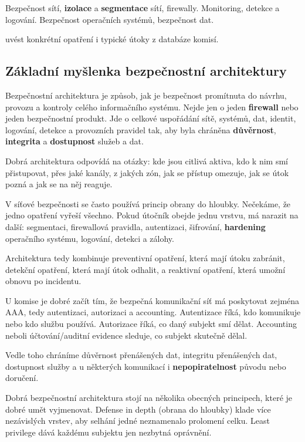 \documentclass[11pt,a4paper]{article}
\begin{document}
Bezpečnost sítí, \textbf{izolace} a \textbf{segmentace} sítí, firewally. Monitoring, detekce a logování. Bezpečnost operačních systémů, bezpečnost dat.

uvést konkrétní opatření i typické útoky z databáze komisí.

\subsection*{Základní myšlenka bezpečnostní architektury}

Bezpečnostní architektura je způsob, jak je bezpečnost promítnuta do návrhu, provozu a kontroly celého informačního systému. Nejde jen o jeden \textbf{firewall} nebo jeden bezpečnostní produkt. Jde o celkové uspořádání sítě, systémů, dat, identit, logování, detekce a provozních pravidel tak, aby byla chráněna \textbf{důvěrnost}, \textbf{integrita} a \textbf{dostupnost} služeb a dat.

Dobrá architektura odpovídá na otázky: kde jsou citlivá aktiva, kdo k nim smí přistupovat, přes jaké kanály, z jakých zón, jak se přístup omezuje, jak se útok pozná a jak se na něj reaguje.

V síťové bezpečnosti se často používá princip obrany do hloubky. Nečekáme, že jedno opatření vyřeší všechno. Pokud útočník obejde jednu vrstvu, má narazit na další: segmentaci, firewallová pravidla, autentizaci, šifrování, \textbf{hardening} operačního systému, logování, detekci a zálohy.

Architektura tedy kombinuje preventivní opatření, která mají útoku zabránit, detekční opatření, která mají útok odhalit, a reaktivní opatření, která umožní obnovu po incidentu.

U komise je dobré začít tím, že bezpečná komunikační síť má poskytovat zejména AAA, tedy autentizaci, autorizaci a accounting. Autentizace říká, kdo komunikuje nebo kdo službu používá. Autorizace říká, co daný subjekt smí dělat. Accounting neboli účtování/auditní evidence sleduje, co subjekt skutečně dělal.

Vedle toho chráníme důvěrnost přenášených dat, integritu přenášených dat, dostupnost služby a u některých komunikací i \textbf{nepopiratelnost} původu nebo doručení.

Dobrá bezpečnostní architektura stojí na několika obecných principech, které je dobré umět vyjmenovat. Defense in depth (obrana do hloubky) klade více nezávislých vrstev, aby selhání jedné neznamenalo prolomení celku. Least privilege dává každému subjektu jen nezbytná oprávnění.
\end{document}
